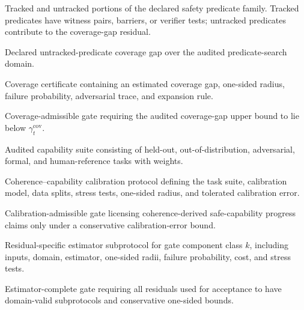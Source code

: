 \documentclass[11pt,a4paper]{article}
\newcommand{\Acal}{\mathcal A}
\newcommand{\Tcal}{\mathcal T}
\newcommand{\calib}{\mathrm{cal}}
\providecommand{\Cap}{\operatorname{Cap}}
\newcommand{\cov}{\mathrm{cov}}
\newcommand{\trk}{\mathrm{trk}}
\newcommand{\untrk}{\mathrm{untrk}}
\newcommand{\est}{\mathrm{est}}
\begin{document}
\begin{description}[leftmargin=2.8cm, style=nextline]
    \item[\(\mathfrak S_t^{\trk},\mathfrak S_t^{\untrk}\)] Tracked and untracked portions of the declared safety predicate family. Tracked predicates have witness pairs, barriers, or verifier tests; untracked predicates contribute to the coverage-gap residual.
    \item[\(\operatorname{CovGap}_t\)] Declared untracked-predicate coverage gap over the audited predicate-search domain.
    \item[\(\mathsf{CovCert}_t\)] Coverage certificate containing an estimated coverage gap, one-sided radius, failure probability, adversarial trace, and expansion rule.
    \item[\(\Acal_{\cov}\)] Coverage-admissible gate requiring the audited coverage-gap upper bound to lie below \(\gamma_t^{\cov}\).
    \item[\(\Tcal_t^{\Cap}\)] Audited capability suite consisting of held-out, out-of-distribution, adversarial, formal, and human-reference tasks with weights.
    \item[\(\mathsf{CalProt}_t\)] Coherence--capability calibration protocol defining the task suite, calibration model, data splits, stress tests, one-sided radius, and tolerated calibration error.
    \item[\(\Acal_{\calib}\)] Calibration-admissible gate licensing coherence-derived safe-capability progress claims only under a conservative calibration-error bound.
    \item[\(\mathsf{Est}_{t,k}\)] Residual-specific estimator subprotocol for gate component class \(k\), including inputs, domain, estimator, one-sided radii, failure probability, cost, and stress tests.
    \item[\(\Acal_{\est}\)] Estimator-complete gate requiring all residuals used for acceptance to have domain-valid subprotocols and conservative one-sided bounds.


\end{description}
\end{document}
